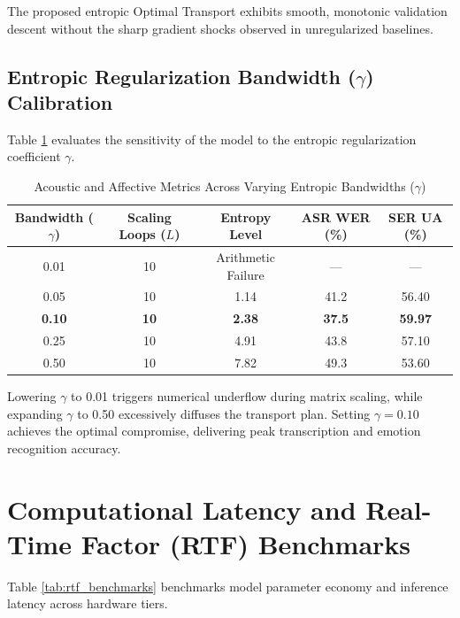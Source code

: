 The proposed entropic Optimal Transport exhibits smooth, monotonic validation descent without the sharp gradient shocks observed in unregularized baselines.

\subsection{Entropic Regularization Bandwidth ($\gamma$) Calibration}
Table \ref{tab:bandwidth_ablation} evaluates the sensitivity of the model to the entropic regularization coefficient $\gamma$.

\begin{table}[htbp]
\centering
\caption{Acoustic and Affective Metrics Across Varying Entropic Bandwidths ($\gamma$)}
\label{tab:bandwidth_ablation}
\begin{tabular}{ccccc}
\toprule
\textbf{Bandwidth ($\gamma$)} & \textbf{Scaling Loops ($L$)} & \textbf{Entropy Level} & \textbf{ASR WER (\%)} & \textbf{SER UA (\%)} \\
\midrule
0.01 & 10 & Arithmetic Failure & — & — \\
0.05 & 10 & 1.14 & 41.2 & 56.40 \\
\textbf{0.10} & \textbf{10} & \textbf{2.38} & \textbf{37.5} & \textbf{59.97} \\
0.25 & 10 & 4.91 & 43.8 & 57.10 \\
0.50 & 10 & 7.82 & 49.3 & 53.60 \\
\bottomrule
\end{tabular}
\end{table}

Lowering $\gamma$ to 0.01 triggers numerical underflow during matrix scaling, while expanding $\gamma$ to 0.50 excessively diffuses the transport plan. Setting $\gamma = 0.10$ achieves the optimal compromise, delivering peak transcription and emotion recognition accuracy.

\section{Computational Latency and Real-Time Factor (RTF) Benchmarks}
Table \ref{tab:rtf_benchmarks} benchmarks model parameter economy and inference latency across hardware tiers.

